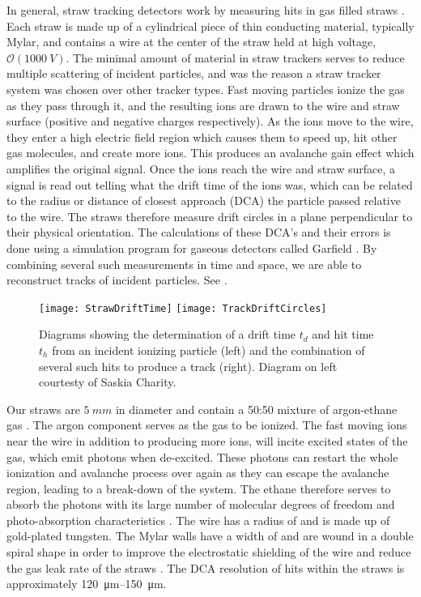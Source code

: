 In general, straw tracking detectors work by measuring hits in gas filled straws \cite{Blum}. Each straw is made up of a cylindrical piece of thin conducting material, typically Mylar, and contains a wire at the center of the straw held at high voltage, $\mathcal{O}(\SI{1000}{V})$. The minimal amount of material in straw trackers serves to reduce multiple scattering of incident particles, and was the reason a straw tracker system was chosen over other tracker types. Fast moving particles ionize the gas as they pass through it, and the resulting ions are drawn to the wire and straw surface (positive and negative charges respectively). As the ions move to the wire, they enter a high electric field region which causes them to speed up, hit other gas molecules, and create more ions. This produces an avalanche gain effect which amplifies the original signal. Once the ions reach the wire and straw surface, a signal is read out telling what the drift time of the ions was, which can be related to the radius or distance of closest approach (DCA) the particle passed relative to the wire. The straws therefore measure drift circles in a plane perpendicular to their physical orientation. The calculations of these DCA's and their errors is done using a simulation program for gaseous detectors called Garfield \cite{garfield1,garfield2}. By combining several such measurements in time and space, we are able to reconstruct tracks of incident particles. See .

\begin{figure}[]
\centering
        \texttt{[image: StrawDriftTime]}
    \hspace{1cm}
        \texttt{[image: TrackDriftCircles]}
\caption[Straw tracker drift circles]{Diagrams showing the determination of a drift time $t_{d}$ and hit time $t_{h}$ from an incident ionizing particle (left) and the combination of several such hits to produce a track (right). Diagram on left courtesty of Saskia Charity.}
\label{fig:driftcircles}
\end{figure}




Our straws are $\SI{5}{mm}$ in diameter and contain a 50:50 mixture of argon-ethane gas \cite{WTThesis}. The argon component serves as the gas to be ionized. The fast moving ions near the wire in addition to producing more ions, will incite excited states of the gas, which emit photons when de-excited. These photons can restart the whole ionization and avalanche process over again as they can escape the avalanche region, leading to a break-down of the system. The ethane therefore serves to absorb the photons with its large number of molecular degrees of freedom and photo-absorption characteristics \cite{WTThesis}. The wire has a radius of  and is made up of gold-plated tungsten. The Mylar walls have a width of  and are wound in a double spiral shape in order to improve the electrostatic shielding of the wire and reduce the gas leak rate of the straws \cite{WTThesis}. The DCA resolution of hits within the straws is approximately \SIrange{120}{150}{\micro m}.


